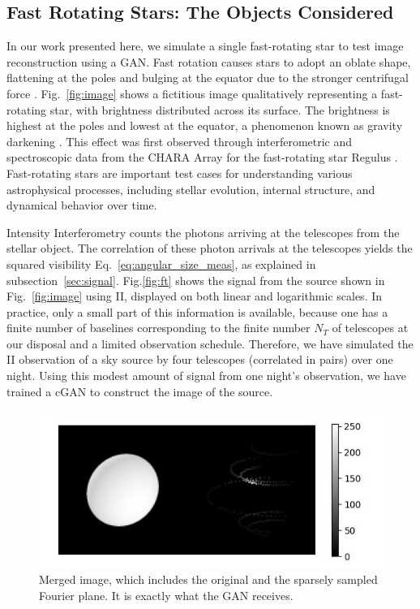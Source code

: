 \subsection{Fast Rotating Stars: The Objects Considered}
In our work presented here, we simulate a single fast-rotating star to test image reconstruction using a GAN. Fast rotation causes stars to adopt an oblate shape, flattening at the poles and bulging at the equator due to the stronger centrifugal force \citep[e.g.,][]{von1924radiative, 1999A&A...347..185M}. Fig.~\ref{fig:image} shows a fictitious image qualitatively representing a fast-rotating star, with brightness distributed across its surface. The brightness is highest at the poles and lowest at the equator, a phenomenon known as gravity darkening \citep{lucy1967gravity}. This effect was first observed through interferometric and spectroscopic data from the CHARA Array for the fast-rotating star Regulus \cite{mcalister2005first}. Fast-rotating stars are important test cases for understanding various astrophysical processes, including stellar evolution, internal structure, and dynamical behavior over time.

Intensity Interferometry counts the photons arriving at the telescopes from the stellar object. The correlation of these photon arrivals at the telescopes yields the squared visibility Eq.~\eqref{eq:angular_size_meas}, as explained in subsection~\ref{sec:signal}. Fig.\ref{fig:ft} shows the signal from the source shown in Fig.~\ref{fig:image} using II, displayed on both linear and logarithmic scales. In practice, only a small part of this information is available, because one has a finite number of baselines corresponding to the finite number $N_T$ of telescopes at our disposal and a limited observation schedule. Therefore, we have simulated the II observation of a sky source by four telescopes (correlated in pairs) over one night. Using this modest amount of signal from one night's observation, we have trained a cGAN to construct the image of the source.
\begin{figure}
	\centering
	\includegraphics[width=\linewidth]{fig/ellipse1612.jpg}
	\caption{Merged image, which includes the original and the sparsely sampled Fourier plane. It is exactly what the GAN receives. }
	\label{fig:GANinput}
\end{figure}

